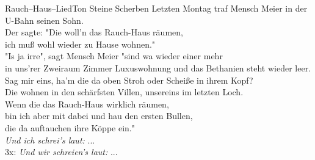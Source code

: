 \begin{lied}{Rauch--Haus--Lied}{Ton Steine Scherben}
Letzten Montag traf Mensch Meier in der U-Bahn seinen Sohn.\\
Der sagte: "Die woll'n das Rauch-Haus räumen,\\
ich muß wohl wieder zu Hause wohnen."\\
"Is ja irre", sagt Mensch Meier "sind wa wieder einer mehr\\
in uns'rer Zweiraum Zimmer Luxuswohnung und das Bethanien steht wieder leer.\\
Sag mir eins, ha'm die da oben Stroh oder Scheiße in ihrem Kopf?\\
Die wohnen in den schärfsten Villen, unsereins im letzten Loch.\\
Wenn die das Rauch-Haus wirklich räumen,\\
bin ich aber mit dabei und hau den ersten Bullen,\\
die da auftauchen ihre Köppe ein."\\

\textit{Und ich schrei's laut:} ...\\

3x: 
\textit{Und wir schreien's laut:} ...\\
\end{lied}
